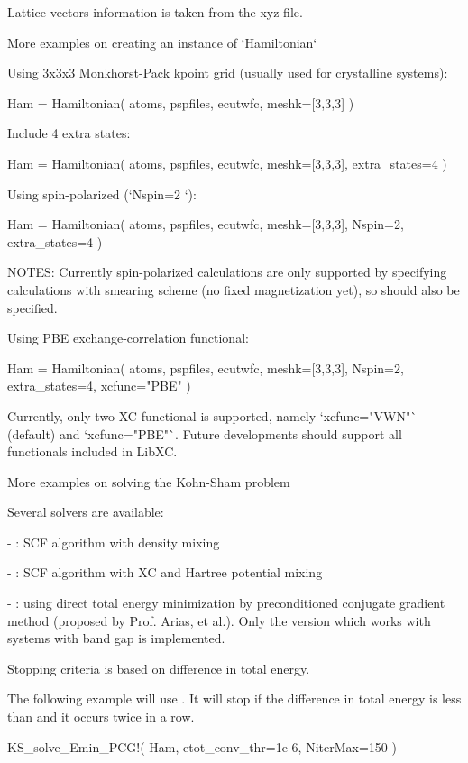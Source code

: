 Lattice vectors information is taken from the xyz file.


More examples on creating an instance of `Hamiltonian`

Using 3x3x3 Monkhorst-Pack kpoint grid (usually used for crystalline systems):
\begin{juliacode}
Ham = Hamiltonian( atoms, pspfiles, ecutwfc, meshk=[3,3,3] )    
\end{juliacode}

Include 4 extra states:
\begin{juliacode}
Ham = Hamiltonian( atoms, pspfiles, ecutwfc, meshk=[3,3,3], extra_states=4 )
\end{juliacode}

Using spin-polarized (`Nspin=2 `):
\begin{juliacode}
Ham = Hamiltonian( atoms, pspfiles, ecutwfc, meshk=[3,3,3],
    Nspin=2, extra_states=4 )
\end{juliacode}

NOTES: Currently spin-polarized calculations are only supported by
specifying calculations with smearing scheme (no fixed magnetization yet),
so  should also be specified.


Using PBE exchange-correlation functional:
\begin{juliacode}
Ham = Hamiltonian( atoms, pspfiles, ecutwfc, meshk=[3,3,3],
    Nspin=2, extra_states=4, xcfunc="PBE" )
\end{juliacode}
Currently, only two XC functional is supported, namely `xcfunc="VWN"` (default) and
`xcfunc="PBE"`. Future developments should support all functionals included in LibXC.


More examples on solving the Kohn-Sham problem

Several solvers are available:

- : SCF algorithm with density mixing

- : SCF algorithm with XC and Hartree potential mixing

- : using direct total energy minimization by preconditioned conjugate
  gradient method (proposed by Prof. Arias, et al.). Only
  the version which works with systems with band gap is implemented.

Stopping criteria is based on difference in total energy.


The following example will use .
It will stop if the difference in total energy is less than
 and it occurs twice in a row.
\begin{juliacode}
KS_solve_Emin_PCG!( Ham, etot_conv_thr=1e-6, NiterMax=150 )
\end{juliacode}

